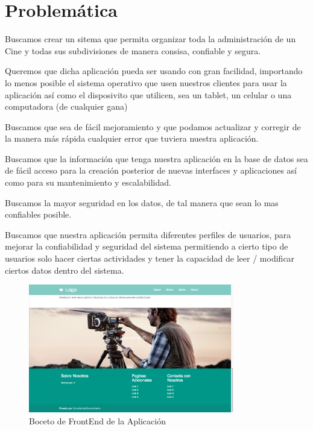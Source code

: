 \documentclass[12pt, fleqn]{article}                             %
\begin{document}
\clearpage
\section{Problemática}
    
    Buscamos crear un sitema que permita organizar toda la administración de un Cine y todas
    sus subdivisiones de manera consisa, confiable y segura.

    Queremos que dicha aplicación pueda ser usando con gran facilidad, importando lo menos posible
    el sistema operativo que usen nuestros clientes para usar la aplicación así como el
    disposivito que utilicen, sea un tablet, un celular o una computadora (de cualquier gana)

    Buscamos que sea de fácil mejoramiento y que podamos actualizar y corregir de la manera más rápida
    cualquier error que tuviera nuestra aplicación.

    Buscamos que la información que tenga nuestra aplicación en la base de datos sea de fácil acceso
    para la creación posterior de nuevas interfaces y aplicaciones así como para su mantenimiento
    y escalabilidad.

    Buscamos la mayor seguridad en los datos, de tal manera que sean lo mas confiables posible.

    Buscamos que nuestra aplicación permita diferentes perfiles de usuarios, para mejorar la confiabilidad
    y seguridad del sistema permitiendo a cierto tipo de usuarios solo hacer ciertas actividades y 
    tener la capacidad de leer / modificar ciertos datos dentro del sistema.



    \begin{figure}[h!]
        \centering
        \includegraphics[width=0.80\textwidth]{Examples2.png}
        \caption{Boceto de FrontEnd de la Aplicación}
    \end{figure}
\end{document}
